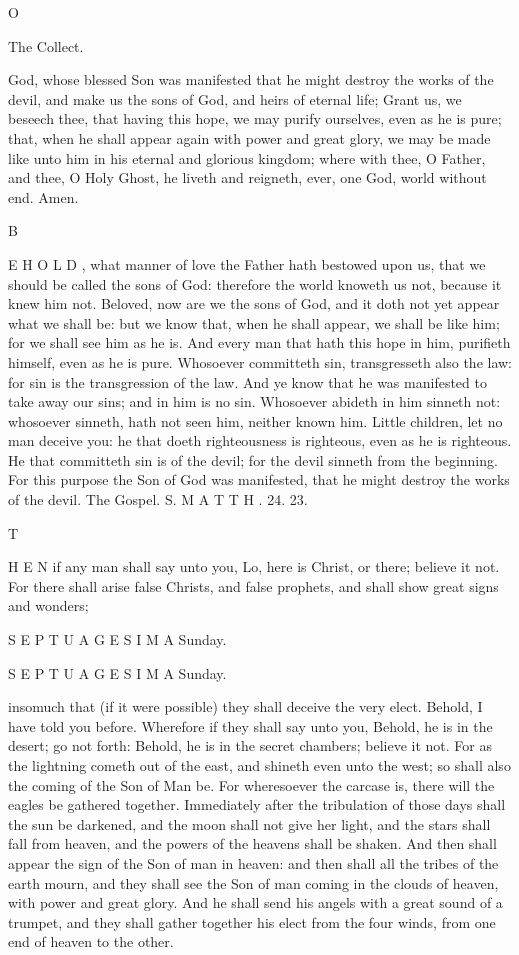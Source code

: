 O

The Collect.

God, whose blessed Son was manifested that he might destroy the works of the devil, and make us the sons of God, and heirs of eternal life; Grant us, we beseech thee, that having this hope, we may purify ourselves, even as he is pure; that, when he shall appear again with power and great glory, we may be made like unto him in his eternal and glorious kingdom; where with thee, O Father, and thee, O Holy Ghost, he liveth and reigneth, ever, one God, world without end. Amen.

B

E H O L D , what manner of love the Father hath bestowed upon us, that we should be called the sons of God: therefore the world knoweth us not, because it knew him not. Beloved, now are we the sons of God, and it doth not yet appear what we shall be: but we know that, when he shall appear, we shall be like him; for we shall see him as he is. And every man that hath this hope in him, purifieth himself, even as he is pure. Whosoever committeth sin, transgresseth also the law: for sin is the transgression of the law. And ye know that he was manifested to take away our sins; and in him is no sin. Whosoever abideth in him sinneth not: whosoever sinneth, hath not seen him, neither known him. Little children, let no man deceive you: he that doeth righteousness is righteous, even as he is righteous. He that committeth sin is of the devil; for the devil sinneth from the beginning. For this purpose the Son of God was manifested, that he might destroy the works of the devil. The Gospel. S. M A T T H . 24. 23.

T

H E N if any man shall say unto you, Lo, here is Christ, or there; believe it not. For there shall arise false Christs, and false prophets, and shall show great signs and wonders;

S E P T U A G E S I M A Sunday.

S E P T U A G E S I M A Sunday.

insomuch that (if it were possible) they shall deceive the very elect. Behold, I have told you before. Wherefore if they shall say unto you, Behold, he is in the desert; go not forth: Behold, he is in the secret chambers; believe it not. For as the lightning cometh out of the east, and shineth even unto the west; so shall also the coming of the Son of Man be. For wheresoever the carcase is, there will the eagles be gathered together. Immediately after the tribulation of those days shall the sun be darkened, and the moon shall not give her light, and the stars shall fall from heaven, and the powers of the heavens shall be shaken. And then shall appear the sign of the Son of man in heaven: and then shall all the tribes of the earth mourn, and they shall see the Son of man coming in the clouds of heaven, with power and great glory. And he shall send his angels with a great sound of a trumpet, and they shall gather together his elect from the four winds, from one end of heaven to the other.

